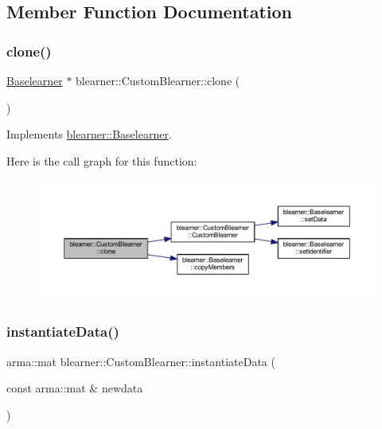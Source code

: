 \subsection{Member Function Documentation}
\mbox{\label{classblearner_1_1_custom_blearner_a7ceeee2b7fffd11f376018bc1d3cfba1}} 
\subsubsection{\texorpdfstring{clone()}{clone()}}
{\footnotesize\ttfamily \hyperlink{classblearner_1_1_baselearner}{Baselearner} $\ast$ blearner\+::\+Custom\+Blearner\+::clone (\begin{DoxyParamCaption}{ }\end{DoxyParamCaption})\hspace{0.3cm}{\ttfamily [virtual]}}



Implements \hyperlink{classblearner_1_1_baselearner_a8e12c6739f085917a7d2da6570c51a21}{blearner\+::\+Baselearner}.

Here is the call graph for this function\+:\nopagebreak
\begin{figure}[H]
\begin{center}
\leavevmode
\includegraphics[width=350pt]{classblearner_1_1_custom_blearner_a7ceeee2b7fffd11f376018bc1d3cfba1_cgraph}
\end{center}
\end{figure}
\mbox{\label{classblearner_1_1_custom_blearner_a18971368219f6948456b8e60c20b6968}} 
\subsubsection{\texorpdfstring{instantiate\+Data()}{instantiateData()}}
{\footnotesize\ttfamily arma\+::mat blearner\+::\+Custom\+Blearner\+::instantiate\+Data (\begin{DoxyParamCaption}\item[{const arma\+::mat \&}]{newdata }\end{DoxyParamCaption})\hspace{0.3cm}{\ttfamily [virtual]}}



